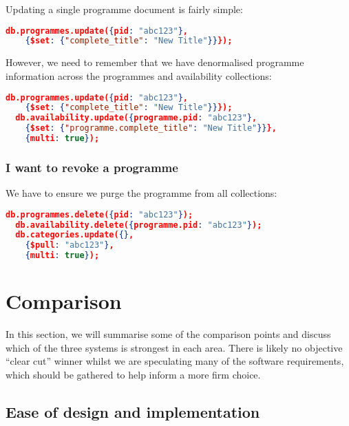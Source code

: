 \documentclass[11pt,a4paper]{article}
\begin{document}
Updating a single programme document is fairly simple:

\begin{lstlisting}[language=json]
  db.programmes.update({pid: "abc123"},
    {$set: {"complete_title": "New Title"}}});
\end{lstlisting}

However, we need to remember that we have denormalised programme
information across the programmes and availability collections:

\begin{lstlisting}[language=json]
  db.programmes.update({pid: "abc123"},
    {$set: {"complete_title": "New Title"}}});
  db.availability.update({programme.pid: "abc123"},
    {$set: {"programme.complete_title": "New Title"}}},
    {multi: true});
\end{lstlisting}

\subsubsection{I want to revoke a programme}

We have to ensure we purge the programme from all collections:

\begin{lstlisting}[language=json]
  db.programmes.delete({pid: "abc123"});
  db.availability.delete({programme.pid: "abc123"});
  db.categories.update({},
    {$pull: "abc123"},
    {multi: true});
\end{lstlisting}

\section{Comparison}

In this section, we will summarise some of the comparison
points and discuss which of the three systems is strongest in each
area. There is likely no objective ``clear cut'' winner whilst
we are speculating many of the software requirements, which
should be gathered to help inform a more firm choice.

\subsection{Ease of design and implementation}
\end{document}
